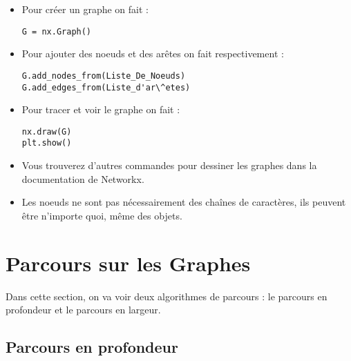 \documentclass[12pt,fleqn]{article} %
\begin{document}
\begin{remark}
	\begin{itemize}
		\item Pour créer un graphe on fait :
\begin{center}
	\begin{varwidth}[t]{.5\textwidth}
		\begin{lstlisting}[language=iPython,linewidth = 12cm]
G = nx.Graph() \end{lstlisting}
\end{varwidth}\end{center}
		\item Pour ajouter des noeuds et des arêtes on fait respectivement : 
		\begin{center}
	\begin{varwidth}[t]{.5\textwidth}
	\begin{lstlisting}[language=iPython,linewidth = 12cm]
G.add_nodes_from(Liste_De_Noeuds)
G.add_edges_from(Liste_d'ar\^etes) \end{lstlisting}
\end{varwidth}\end{center}
\item Pour tracer et voir le graphe on fait :
\begin{center}
	\begin{varwidth}[t]{.5\textwidth}
	\begin{lstlisting}[language=iPython,linewidth = 12cm]
nx.draw(G)
plt.show() \end{lstlisting}
\end{varwidth}\end{center}
\item Vous trouverez d'autres commandes pour dessiner les graphes dans la documentation de Networkx.
\item Les noeuds ne sont pas nécessairement des chaînes de caractères, ils peuvent être n'importe quoi, même des  objets.
	\end{itemize}
\end{remark}



\section{Parcours sur les Graphes}

Dans cette section, on va voir deux algorithmes de parcours : le parcours en profondeur et le parcours en largeur.

\subsection{Parcours en profondeur}
\end{document}
